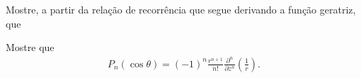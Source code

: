 \documentclass[a4paper,12pt, leqno, answers]{exam}
\begin{document}
\begin{questions}
    \question Mostre, a partir da rela\c{c}\~{a}o de recorr\^{e}ncia que segue derivando a fun\c{c}\~{a}o geratriz, que

    \question Mostre que
    \begin{align*}
        P_n(\cos \theta) = (-1)^n \frac{r^{n + 1}}{n!} \frac{\partial^n}{\partial z^n} \left( \frac{1}{r} \right).
    \end{align*}
    \begin{solution}
        
    \end{solution}


\end{questions}
\end{document}
